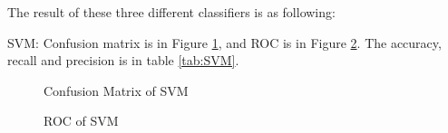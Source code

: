 \documentclass{article}
\begin{document}
The result of these three different classifiers is as following:

SVM: Confusion matrix is in Figure \ref{fig:CMSVM}, and ROC is in Figure \ref{fig:ROCSVM}. The accuracy, recall and precision is in table \ref{tab:SVM}.


\begin{figure}
\centering
{}
\caption{Confusion Matrix of SVM} \label{fig:CMSVM}
\end{figure}


\begin{figure}
\centering
{}
\caption{ROC of SVM} \label{fig:ROCSVM}
\end{figure}


\begin{table}[h]
\center
\caption{Estimation result for SVM}
\label{tab:SVM}
\end{table}
\end{document}
